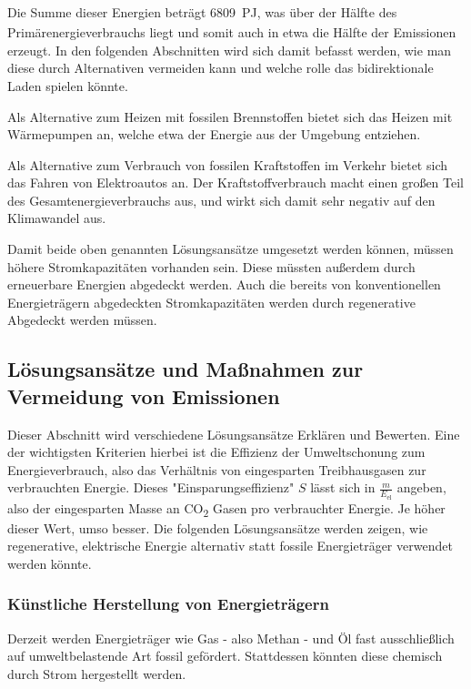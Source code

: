 \documentclass[12pt, ngerman]{article}
\newcommand{\pe}{_{\text{PE}}}
\newcommand{\el}{_{\text{el}}}
\begin{document}
    Die Summe dieser Energien beträgt \qty{6809}{PJ\pe}, was über der Hälfte des Primärenergieverbrauchs liegt und
    somit auch in etwa die Hälfte der Emissionen erzeugt.
    In den folgenden Abschnitten wird sich damit befasst werden, wie man diese durch Alternativen vermeiden kann und
    welche rolle das bidirektionale Laden spielen könnte.

    Als Alternative zum Heizen mit fossilen Brennstoffen bietet sich das Heizen mit Wärmepumpen an, welche etwa
    \unit{} der Energie aus der Umgebung entziehen.

    Als Alternative zum Verbrauch von fossilen Kraftstoffen im Verkehr bietet sich das Fahren von Elektroautos an.
    Der Kraftstoffverbrauch macht einen großen Teil des Gesamtenergieverbrauchs aus, und wirkt sich damit sehr
    negativ auf den Klimawandel aus.

    Damit beide oben genannten Lösungsansätze umgesetzt werden können, müssen höhere Stromkapazitäten vorhanden sein.
    Diese müssten außerdem durch erneuerbare Energien abgedeckt werden.
    Auch die bereits von konventionellen Energieträgern abgedeckten Stromkapazitäten werden durch regenerative
    Abgedeckt werden müssen.

    \subsection{Lösungsansätze und Maßnahmen zur Vermeidung von Emissionen}

    Dieser Abschnitt wird verschiedene Lösungsansätze Erklären und Bewerten.
    Eine der wichtigsten Kriterien hierbei ist die Effizienz der Umweltschonung zum Energieverbrauch, also das
    Verhältnis von eingesparten Treibhausgasen zur verbrauchten Energie.
    Dieses "Einsparungseffizienz" $S$ lässt sich in
    \(\frac{\si{m}}{\si{E\el}}\) angeben, also der eingesparten Masse an \si{CO_{2}} Gasen pro verbrauchter Energie.
    Je höher dieser Wert, umso besser.
    Die folgenden Lösungsansätze werden zeigen, wie regenerative, elektrische Energie alternativ statt fossile
    Energieträger verwendet werden könnte.

    \subsubsection{Künstliche Herstellung von Energieträgern}
    Derzeit werden Energieträger wie Gas - also Methan - und Öl fast ausschließlich auf umweltbelastende Art fossil
    gefördert.
    Stattdessen könnten diese chemisch durch Strom hergestellt werden.
\end{document}
